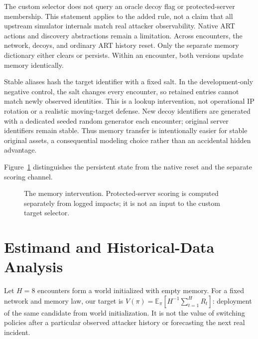\documentclass[sigconf,nonacm]{acmart}
\begin{document}
The custom selector does not query an oracle decoy flag or protected-server membership. This statement applies to the added rule, not a claim that all upstream simulator internals match real attacker observability. Native ART actions and discovery abstractions remain a limitation. Across encounters, the network, decoys, and ordinary ART history reset. Only the separate memory dictionary either clears or persists. Within an encounter, both versions update memory identically.

Stable aliases hash the target identifier with a fixed salt. In the development-only negative control, the salt changes every encounter, so retained entries cannot match newly observed identities. This is a lookup intervention, not operational IP rotation or a realistic moving-target defense. New decoy identifiers are generated with a dedicated seeded random generator each encounter; original server identifiers remain stable. Thus memory transfer is intentionally easier for stable original assets, a consequential modeling choice rather than an accidental hidden advantage.

Figure~\ref{fig:design} distinguishes the persistent state from the native reset and the separate scoring channel.
\begin{figure}[t]
\centering
{}
\caption{The memory intervention. Protected-server scoring is computed separately from logged impacts; it is not an input to the custom target selector.}
\label{fig:design}
\end{figure}

\section{Estimand and Historical-Data Analysis}
Let $H=8$ encounters form a world initialized with empty memory. For a fixed network and memory law, our target is $V(\pi)=\mathbb{E}_{\pi}[H^{-1}\sum_{t=1}^H R_t]$: deployment of the same candidate from world initialization. It is not the value of switching policies after a particular observed attacker history or forecasting the next real incident.
\end{document}
